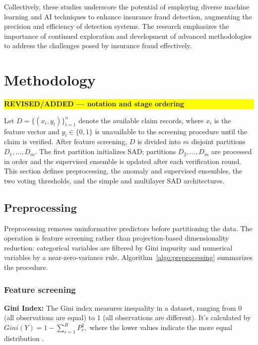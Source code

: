 \documentclass[12pt]{article}
\newcommand{\revmark}[1]{\par\noindent\colorbox{yellow}{%
  \parbox{\dimexpr\linewidth-2\fboxsep}{\raggedright\strut\textbf{#1}}}%
  \par\smallskip}
\begin{document}
Collectively, these studies underscore the potential of employing
diverse machine learning and AI techniques to enhance insurance
fraud detection, augmenting the precision and efficiency of
detection systems. The research emphasizes the importance of
continued exploration and development of advanced methodologies to
address the challenges posed by insurance fraud effectively.


\fi
\section{Methodology}\label{SC:METHOD}
\revmark{REVISED/ADDED --- notation and stage ordering}
Let $D=\{(x_i,y_i)\}_{i=1}^{n}$ denote the available claim records, where
$x_i$ is the feature vector and $y_i\in\{0,1\}$ is unavailable to the
screening procedure until the claim is verified. After feature screening,
$D$ is divided into $m$ disjoint partitions $D_1,\ldots,D_m$. The first
partition initializes SAD; partitions $D_2,\ldots,D_m$ are processed in order
and the supervised ensemble is updated after each verification round. This
section defines preprocessing, the anomaly and supervised ensembles, the two
voting thresholds, and the simple and multilayer SAD architectures.

\subsection{Preprocessing}\label{SSC:PreProcessing}
Preprocessing removes uninformative predictors before partitioning the data.
The operation is feature screening rather than projection-based dimensionality
reduction: categorical variables are filtered by Gini impurity and numerical
variables by a near-zero-variance rule. Algorithm~\ref{algo:preprocessing}
summarizes the procedure.
\subsubsection*{Feature screening}

\textbf{\small Gini Index:} The Gini index measures inequality in
a dataset, ranging from 0 (all observations are equal) to 1 (all
observations are different). It's calculated by $Gini(Y) = 1 -
\displaystyle\sum_{r=1}^{R} P_r^2,$ where the lower values
indicate the more equal distribution \cite{A59}.
\end{document}
